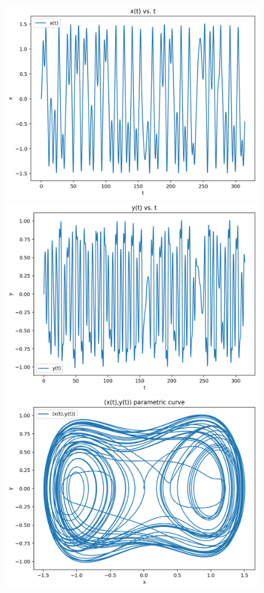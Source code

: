 \documentclass{article}
\begin{document}
\begin{figure}[h!]
\includegraphics[scale=0.4]{x(t)6.png}
\includegraphics[scale=0.4]{y(t)6.png}
\includegraphics[scale=0.4]{parametriccurve6.png}

\end{figure}
\end{document}
